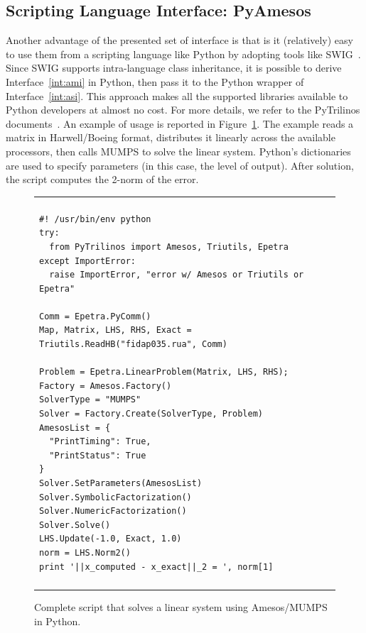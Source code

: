 \documentclass[acmtocl]{acmtrans2m}
\begin{document}
\subsection{Scripting Language Interface: PyAmesos}
\label{sec:pyamesos}

Another advantage of the presented set of interface is that is it (relatively)
  easy to use them from a scripting language like Python by adopting tools
  like SWIG~\cite{swig}. Since SWIG supports intra-language class inheritance,
  it is possible to derive Interface~\ref{int:ami} in Python, then pass it
  to the Python wrapper of Interface~\ref{int:asi}. This approach makes all the
  supported libraries available to Python developers at almost no cost. For
  more details, we refer to the PyTrilinos
  documents~\cite{sala05pytrilinos,pytrilinos-la-guide}. 
An example of usage is reported in Figure~\ref{fig:pyamesos}. The example
reads a matrix in Harwell/Boeing format, distributes it linearly across the
available processors, then calls MUMPS to solve the linear system. Python's
dictionaries are used to specify parameters (in this case, the level of
                                             output). After solution, the
script computes the 2-norm of the error.

\begin{figure}
\begin{center}
\begin{tabular}{| p{12cm} |}
\hline
\\
\footnotesize
\begin{minipage}{11.5cm}
\begin{verbatim}
#! /usr/bin/env python
try:
  from PyTrilinos import Amesos, Triutils, Epetra
except ImportError:
  raise ImportError, "error w/ Amesos or Triutils or Epetra"

Comm = Epetra.PyComm()
Map, Matrix, LHS, RHS, Exact = Triutils.ReadHB("fidap035.rua", Comm)

Problem = Epetra.LinearProblem(Matrix, LHS, RHS);
Factory = Amesos.Factory()
SolverType = "MUMPS"
Solver = Factory.Create(SolverType, Problem)
AmesosList = {
  "PrintTiming": True,
  "PrintStatus": True
}
Solver.SetParameters(AmesosList)
Solver.SymbolicFactorization()
Solver.NumericFactorization()
Solver.Solve()
LHS.Update(-1.0, Exact, 1.0)
norm = LHS.Norm2()
print '||x_computed - x_exact||_2 = ', norm[1]
\end{verbatim}
\end{minipage}
\\
\\
\hline
\end{tabular}
\caption{Complete script that solves a linear system using Amesos/MUMPS in
  Python.}
\label{fig:pyamesos}
\end{center}
\end{figure}
\end{document}
